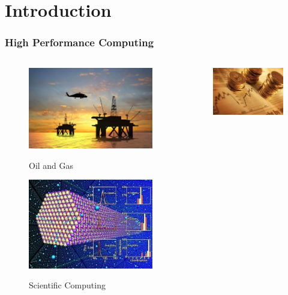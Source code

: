 \section{Introduction}

\begin{frame}
  \frametitle{High Performance Computing}
  \begin{columns}
    \begin{center}
      \begin{figure}
        \includegraphics[scale=0.2]{figs/oil-gas-industry.jpg}\\
        \caption{Oil and Gas}
      \end{figure}
      \vspace{-0.5cm}
      \begin{figure}
        \includegraphics[scale=0.3]{figs/scientific-computing.jpg}\\
        \caption{Scientific Computing}
      \end{figure}
    \end{center}
    \begin{center}
      \begin{figure}
        \includegraphics[scale=0.31]{figs/finance.jpg}\\

\end{figure}
\end{center}
\end{columns}
\end{frame}
